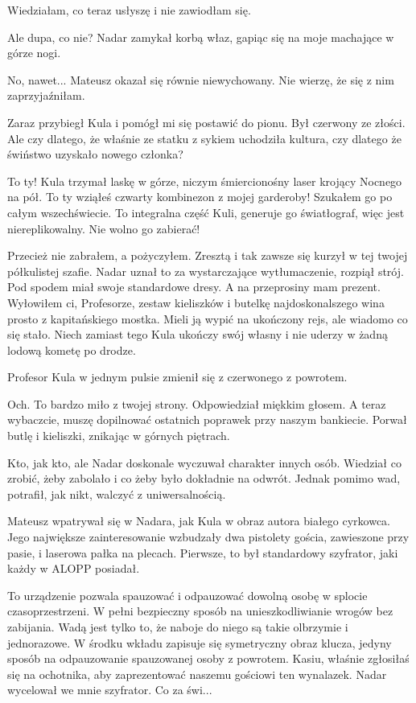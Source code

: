 Wiedziałam, co teraz usłyszę i nie zawiodłam się.

\ds{} Ale dupa, co nie? \dm{} Nadar zamykał korbą właz, gapiąc się na moje machające w górze nogi. \de{}

\ds{} No, nawet... \dm{} Mateusz okazał się równie niewychowany. Nie wierzę, że się z nim zaprzyjaźniłam. \de{}

Zaraz przybiegł Kula i pomógł mi się postawić do pionu. Był czerwony ze złości.
Ale czy dlatego, że właśnie ze statku z sykiem uchodziła kultura, czy dlatego że świństwo uzyskało nowego członka?

\ds{} To ty! \dm{} Kula trzymał laskę w górze, niczym śmiercionośny laser krojący Nocnego na pół. \dm{} To ty wziąłeś czwarty kombinezon z mojej garderoby! Szukałem go po całym wszechświecie. To integralna część Kuli, generuje go światłograf, więc jest niereplikowalny. Nie wolno go zabierać! \de{}

\ds{} Przecież nie zabrałem, a pożyczyłem. Zresztą i tak zawsze się kurzył w tej twojej półkulistej szafie. \dm{}
Nadar uznał to za wystarczające wytłumaczenie, rozpiął strój. Pod spodem miał swoje standardowe dresy. \dm{} 
A na przeprosiny mam prezent. Wyłowiłem ci, Profesorze, zestaw kieliszków i butelkę najdoskonalszego wina prosto z kapitańskiego mostka.
Mieli ją wypić na ukończony rejs, ale wiadomo co się stało. Niech zamiast tego Kula ukończy swój własny i nie uderzy w żadną lodową kometę po drodze. \de{}

Profesor Kula w jednym pulsie zmienił się z czerwonego z powrotem. 

\ds{} Och. To bardzo miło z twojej strony. \dm{} Odpowiedział miękkim głosem. \dm{} A teraz wybaczcie, muszę dopilnować ostatnich poprawek przy naszym bankiecie. \dm{}
Porwał butlę i kieliszki, znikając w górnych piętrach.

Kto, jak kto, ale Nadar doskonale wyczuwał charakter innych osób.
Wiedział co zrobić, żeby zabolało i co żeby było dokładnie na odwrót.
Jednak pomimo wad, potrafił, jak nikt, walczyć z uniwersalnością.

Mateusz wpatrywał się w Nadara, jak Kula w obraz autora białego cyrkowca.
Jego największe zainteresowanie wzbudzały dwa pistolety gościa, zawieszone przy pasie, i laserowa pałka na plecach.
Pierwsze, to był standardowy szyfrator, jaki każdy w ALOPP posiadał.

\ds{} To urządzenie pozwala spauzować i odpauzować dowolną osobę w splocie czasoprzestrzeni.
W pełni bezpieczny sposób na unieszkodliwianie wrogów bez zabijania.
Wadą jest tylko to, że naboje do niego są takie olbrzymie i jednorazowe.
W środku wkładu zapisuje się symetryczny obraz klucza, jedyny sposób na odpauzowanie spauzowanej osoby z powrotem.
Kasiu, właśnie zgłosiłaś się na ochotnika, aby zaprezentować naszemu gościowi ten wynalazek. \dm{} Nadar wycelował we mnie szyfrator. Co za świ...

